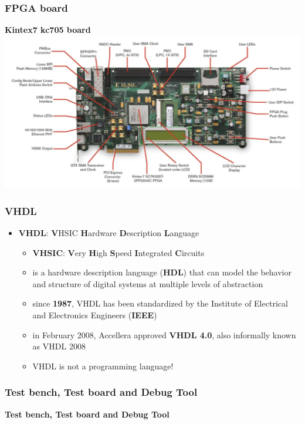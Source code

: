\documentclass[aspectratio=169]{beamer}
\begin{document}
	
	\begin{frame}
	\frametitle{FPGA board }
	\begin{center}
		\textbf{Kintex7 kc705 board}
		\includegraphics[width=0.85 \textwidth]{IMG/KC705.PNG}
	\end{center}
	\end{frame}

	\begin{frame}
	\frametitle{VHDL}
	{\LARGE
	\begin{itemize}
		\item \textbf{VHDL}: \textbf{V}HSIC \textbf{H}ardware \textbf{D}escription \textbf{L}anguage 
		\begin{itemize}
			\item \textbf{VHSIC}: \textbf{V}ery \textbf{H}igh \textbf{S}peed \textbf{I}ntegrated \textbf{C}ircuits
			\item is a hardware description language (\textbf{HDL}) that can model the behavior and structure of digital systems at multiple levels of abstraction
			\item since \textbf{1987}, VHDL has been standardized by the Institute of Electrical and Electronics Engineers (\textbf{IEEE})
			\item in February 2008, Accellera approved \textbf{VHDL 4.0}, also informally known as VHDL 2008
			\item {\color{orange} VHDL is not a programming language!}
		\end{itemize}
	\end{itemize}
	}
	\end{frame}


	\begin{frame}
	\frametitle{Test bench, Test board and Debug Tool}
	\begin{center}
		{\Huge {}\selectfont \color{blue} \textbf{Test bench, Test board and Debug Tool}}
	\end{center}
	\end{frame}
\end{document}
